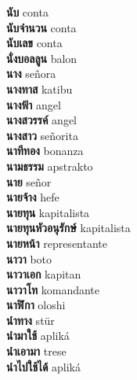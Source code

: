 \textbf{ นับ  } conta \\
\textbf{ นับจำนวน  } conta \\
\textbf{ นับเลข  } conta \\
\textbf{ นั่งบอลลูน  } balon \\
\textbf{ นาง  } señora \\
\textbf{ นางทาส  } katibu \\
\textbf{ นางฟ้า  } angel \\
\textbf{ นางสวรรค์  } angel \\
\textbf{ นางสาว  } señorita \\
\textbf{ นาทีทอง  } bonanza \\
\textbf{ นามธรรม  } apstrakto \\
\textbf{ นาย  } señor \\
\textbf{ นายจ้าง  } hefe \\
\textbf{ นายทุน  } kapitalista \\
\textbf{ นายทุนหัวอนุรักษ์  } kapitalista \\
\textbf{ นายหน้า  } representante \\
\textbf{ นาวา  } boto \\
\textbf{ นาวาเอก  } kapitan \\
\textbf{ นาวาโท  } komandante \\
\textbf{ นาฬิกา  } oloshi \\
\textbf{ นำทาง  } stür \\
\textbf{ นำมาใช้  } apliká \\
\textbf{ นำเอามา  } trese \\
\textbf{ นำไปใช้ได้  } apliká \\
